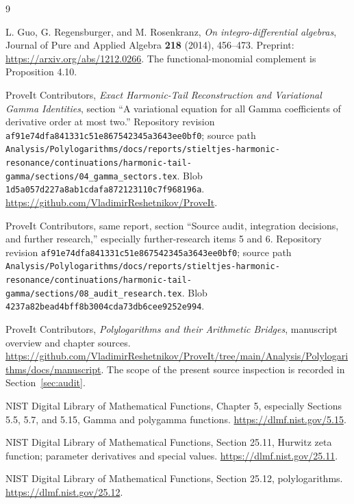 \documentclass[11pt,letterpaper]{article}
\numberwithin{equation}{section}
\theoremstyle{plain}
\theoremstyle{definition}
\theoremstyle{remark}
\newcommand{\src}[1]{\nolinkurl{#1}}
\newcommand{\sourcecommit}{af91e74dfa841331c51e867542345a3643ee0bf0}
\begin{document}
\begin{thebibliography}{9}

L. Guo, G. Regensburger, and M. Rosenkranz,
\emph{On integro-differential algebras},
Journal of Pure and Applied Algebra \textbf{218} (2014), 456--473.
Preprint: \url{https://arxiv.org/abs/1212.0266}.
The functional-monomial complement is Proposition 4.10.

ProveIt Contributors,
\emph{Exact Harmonic-Tail Reconstruction and Variational Gamma Identities},
section ``A variational equation for all Gamma coefficients of derivative order at most two.''
Repository revision \texttt{\sourcecommit}; source path
\src{Analysis/Polylogarithms/docs/reports/stieltjes-harmonic-resonance/continuations/harmonic-tail-gamma/sections/04_gamma_sectors.tex}.
Blob \src{1d5a057d227a8ab1cdafa872123110c7f968196a}.
\url{https://github.com/VladimirReshetnikov/ProveIt}.

ProveIt Contributors, same report, section ``Source audit, integration decisions, and further research,'' especially further-research items 5 and 6.
Repository revision \texttt{\sourcecommit}; source path
\src{Analysis/Polylogarithms/docs/reports/stieltjes-harmonic-resonance/continuations/harmonic-tail-gamma/sections/08_audit_research.tex}.
Blob \src{4237a82bead4bff8b3004cda73db6cee9252e994}.

ProveIt Contributors,
\emph{Polylogarithms and their Arithmetic Bridges}, manuscript overview and chapter sources.
\url{https://github.com/VladimirReshetnikov/ProveIt/tree/main/Analysis/Polylogarithms/docs/manuscript}.
The scope of the present source inspection is recorded in Section~\ref{sec:audit}.

NIST Digital Library of Mathematical Functions,
Chapter 5, especially Sections 5.5, 5.7, and 5.15, Gamma and polygamma functions.
\url{https://dlmf.nist.gov/5.15}.

NIST Digital Library of Mathematical Functions,
Section 25.11, Hurwitz zeta function; parameter derivatives and special values.
\url{https://dlmf.nist.gov/25.11}.

NIST Digital Library of Mathematical Functions,
Section 25.12, polylogarithms.
\url{https://dlmf.nist.gov/25.12}.

\end{thebibliography}

\end{document}
